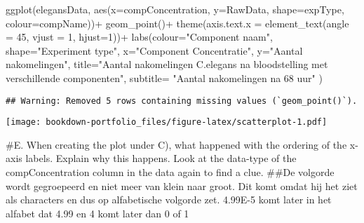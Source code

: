 \documentclass[
]{book}
\newenvironment{Shaded}{\begin{snugshade}}{\end{snugshade}}
\newcommand{\AttributeTok}[1]{\textcolor[rgb]{0.77,0.63,0.00}{#1}}
\newcommand{\DecValTok}[1]{\textcolor[rgb]{0.00,0.00,0.81}{#1}}
\newcommand{\FunctionTok}[1]{\textcolor[rgb]{0.00,0.00,0.00}{#1}}
\newcommand{\NormalTok}[1]{#1}
\newcommand{\OtherTok}[1]{\textcolor[rgb]{0.56,0.35,0.01}{#1}}
\newcommand{\SpecialCharTok}[1]{\textcolor[rgb]{0.00,0.00,0.00}{#1}}
\newcommand{\StringTok}[1]{\textcolor[rgb]{0.31,0.60,0.02}{#1}}
\begin{document}
\begin{Shaded}
\begin{Highlighting}[]
  \FunctionTok{ggplot}\NormalTok{(elegansData, }\FunctionTok{aes}\NormalTok{(}\AttributeTok{x=}\NormalTok{compConcentration, }\AttributeTok{y=}\NormalTok{RawData, }\AttributeTok{shape=}\NormalTok{expType, }\AttributeTok{colour=}\NormalTok{compName))}\SpecialCharTok{+}
  \FunctionTok{geom\_point}\NormalTok{()}\SpecialCharTok{+}
  \FunctionTok{theme}\NormalTok{(}\AttributeTok{axis.text.x =} \FunctionTok{element\_text}\NormalTok{(}\AttributeTok{angle =} \DecValTok{45}\NormalTok{, }\AttributeTok{vjust =} \DecValTok{1}\NormalTok{, }\AttributeTok{hjust=}\DecValTok{1}\NormalTok{))}\SpecialCharTok{+}
  \FunctionTok{labs}\NormalTok{(}\AttributeTok{colour=}\StringTok{"Component naam"}\NormalTok{, }\AttributeTok{shape=}\StringTok{"Experiment type"}\NormalTok{,}
       \AttributeTok{x=}\StringTok{"Component Concentratie"}\NormalTok{,}
       \AttributeTok{y=}\StringTok{"Aantal nakomelingen"}\NormalTok{,}
       \AttributeTok{title=}\StringTok{"Aantal nakomelingen C.elegans na bloodstelling met verschillende componenten"}\NormalTok{,}
       \AttributeTok{subtitle=} \StringTok{"Aantal nakomelingen na 68 uur"}
\NormalTok{)}
\end{Highlighting}
\end{Shaded}

\begin{verbatim}
## Warning: Removed 5 rows containing missing values (`geom_point()`).
\end{verbatim}

\texttt{[image: bookdown-portfolio\_files/figure-latex/scatterplot-1.pdf]}

\#E. When creating the plot under C), what happened with the ordering of the x-axis labels. Explain why this happens. Look at the data-type of the compConcentration column in the data again to find a clue.
\#\#De volgorde wordt gegroepeerd en niet meer van klein naar groot. Dit komt omdat hij het ziet als characters en dus op alfabetische volgorde zet. 4.99E-5 komt later in het alfabet dat 4.99 en 4 komt later dan 0 of 1

\begin{Shaded}
\end{Shaded}
\end{document}
